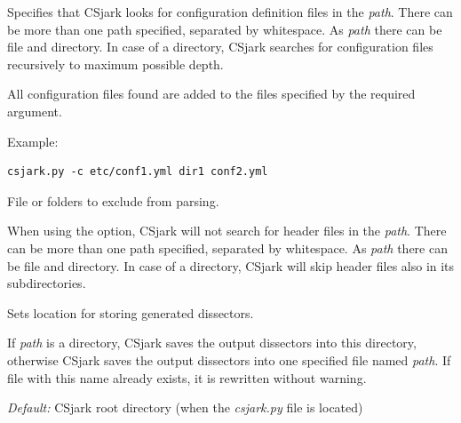 \documentclass[A4paper,10pt,english]{sphinxmanual}
\begin{document}
\begin{fulllineitems}
\label{user/use:cmdoption-c}
Specifies that CSjark looks for configuration definition files in the \emph{path}. There can be more than one path specified, separated by whitespace. As \emph{path} there can be file and directory. In case of a directory, CSjark searches for configuration files recursively to maximum possible depth.

All configuration files found are added to the files specified by the required  argument.

Example:

\begin{Verbatim}[commandchars=\\\{\}]
csjark.py -c etc/conf1.yml dir1 conf2.yml
\end{Verbatim}

\end{fulllineitems}


\begin{fulllineitems}
\label{user/use:cmdoption-x}
File or folders to exclude from parsing.

When using the option, CSjark will not search for header files in the \emph{path}. There can be more than one path specified, separated by whitespace. As \emph{path} there can be file and directory. In case of a directory, CSjark will skip header files also in its subdirectories.

\end{fulllineitems}


\begin{fulllineitems}
\label{user/use:cmdoption-o}
Sets location for storing generated dissectors.

If \emph{path} is a directory, CSjark saves the output dissectors into this directory, otherwise CSjark saves the output dissectors into one specified file named \emph{path}. If file with this name already exists, it is rewritten without warning.

\emph{Default:} CSjark root directory (when the \emph{csjark.py} file is located)

\end{fulllineitems}
\end{document}
